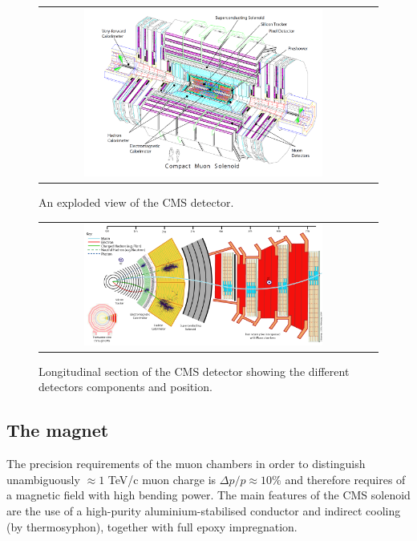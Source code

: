 \begin{figure}[tbh!]
	\centering
	\begin{tabular}{cc}
		\includegraphics[width=0.75\textwidth]{detector/pics/CMS_apparatus.png}
	\end{tabular}
	\caption{An exploded view of the CMS detector.}
	\label{fig:CMS_apparatus}
\end{figure}

\begin{figure}[tbh!]
	\centering
	\begin{tabular}{cc}
		\includegraphics[width=0.75\textwidth]{detector/pics/CMS_slice.png}
	\end{tabular}
	\caption{Longitudinal section of the CMS detector showing the different detectors components and position.}
	\label{fig:CMS_slice}
\end{figure}

\clearpage

\subsection{The magnet}

The precision requirements of the muon chambers in order to distinguish unambiguously $\approx 1$ TeV/c muon charge is $\Delta p / p \approx 10\%$ and therefore requires of a magnetic field with high bending power. The main features of the CMS solenoid are the use of a high-purity aluminium-stabilised conductor and indirect cooling (by thermosyphon), together with full epoxy impregnation.

